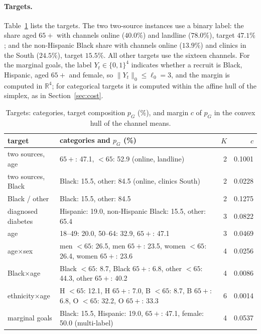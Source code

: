\documentclass[twoside]{article}
\begin{document}
\paragraph{Targets.} Table~\ref{tab:targets} lists the targets. The two
two-source instances use a binary label: the share aged \(65+\) with
channels online (\(40.0\%\)) and landline (\(78.0\%\)), target \(47.1\%\);
and the non-Hispanic Black share with channels online (\(13.9\%\)) and
clinics in the South (\(24.5\%\)), target \(15.5\%\). All other targets use
the sixteen channels. For the marginal goals, the label
\(Y_t\in\{0,1\}^4\) indicates whether a recruit is Black, Hispanic, aged
\(65+\) and female, so \(\|Y_t\|_0\le\ell_0=3\), and the margin is computed
in \(\mathbb R^4\); for categorical targets it is computed within the
affine hull of the simplex, as in Section~\ref{sec:cost}.

\begin{table}[!ht]
\caption{Targets: categories, target composition \(p_G\) (\%), and margin
\(c\) of \(p_G\) in the convex hull of the channel means.}
\label{tab:targets}
\centering\small
\begin{tabular}{llrr}
\hline
target & categories and \(p_G\) (\%) & \(K\) & \(c\)\\
\hline
two sources, age & \(65+\): 47.1, \(<65\): 52.9 (online, landline) & 2 & 0.1001\\
two sources, Black & Black: 15.5, other: 84.5 (online, clinics South) & 2 & 0.0228\\
\hline
Black / other & Black: 15.5, other: 84.5 & 2 & 0.1275\\
diagnosed diabetes & Hispanic: 19.0, non-Hispanic Black: 15.5, other: 65.4 & 3 & 0.0822\\
age & 18--49: 20.0, 50--64: 32.9, \(65+\): 47.1 & 3 & 0.0469\\
age\(\times\)sex & men \(<65\): 26.5, men \(65+\): 23.5, women \(<65\): 26.4, women \(65+\): 23.6 & 4 & 0.0256\\
Black\(\times\)age & Black \(<65\): 8.7, Black \(65+\): 6.8, other \(<65\): 44.3, other \(65+\): 40.2 & 4 & 0.0086\\
ethnicity\(\times\)age & H \(<65\): 12.1, H \(65+\): 7.0, B \(<65\): 8.7, B \(65+\): 6.8, O \(<65\): 32.2, O \(65+\): 33.3 & 6 & 0.0014\\
marginal goals & Black: 15.5, Hispanic: 19.0, \(65+\): 47.1, female: 50.0 (multi-label) & 4 & 0.0537\\
\hline
\end{tabular}
\end{table}
\end{document}
